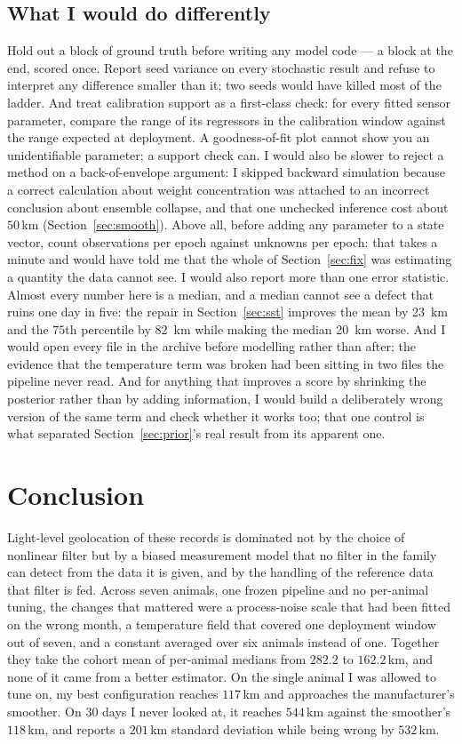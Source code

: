 \documentclass[conference]{IEEEtran}
\begin{document}
\subsection{What I would do differently}
Hold out a block of ground truth before writing any model code --- a block at the
end, scored once. Report seed variance on every stochastic result and refuse to
interpret any difference smaller than it; two seeds would have killed most of the
ladder. And treat calibration support as a first-class check: for every fitted
sensor parameter, compare the range of its regressors in the calibration window
against the range expected at deployment. A goodness-of-fit plot cannot show you
an unidentifiable parameter; a support check can. I would also be slower to
reject a method on a back-of-envelope argument: I skipped backward simulation
because a correct calculation about weight concentration was attached to an
incorrect conclusion about ensemble collapse, and that one unchecked inference
cost about $50$\,\si{\km} (Section~\ref{sec:smooth}). Above all, before adding any
parameter to a state vector, count observations per epoch against unknowns per
epoch: that takes a minute and would have told me that the whole of
Section~\ref{sec:fix} was estimating a quantity the data cannot see. I would also report more than one error statistic. Almost every number here is a median, and a median cannot see a defect that ruins one day in five: the repair in Section~\ref{sec:sst} improves the mean by \SI{23}{\km} and the $75$th percentile by \SI{82}{\km} while making the median \SI{20}{\km} worse. And I would open every file in the archive before modelling rather than after; the evidence that the temperature term was broken had been sitting in two files the pipeline never read. And for anything that
improves a score by shrinking the posterior rather than by adding information,
I would build a deliberately wrong version of the same term and check whether it
works too; that one control is what separated Section~\ref{sec:prior}'s real
result from its apparent one.

\section{Conclusion}
Light-level geolocation of these records is dominated not by the choice of
nonlinear filter but by a biased measurement model that no filter in the
family can detect from the data it is given, and by the handling of the
reference data that filter is fed. Across seven animals, one frozen pipeline
and no per-animal tuning, the changes that mattered were a process-noise scale
that had been fitted on the wrong month, a temperature field that covered one
deployment window out of seven, and a constant averaged over six animals
instead of one. Together they take the cohort mean of per-animal medians from
$282.2$ to $162.2$\,\si{\km}, and none of it came from a better estimator. On
the single animal I was allowed to tune on, my best
configuration reaches $117$\,\si{\km} and approaches the manufacturer's
smoother. On 30 days I never looked at, it reaches $544$\,\si{\km} against the
smoother's $118$\,\si{\km}, and reports a $201$\,\si{\km} standard deviation
while being wrong by $532$\,\si{\km}.
\end{document}
